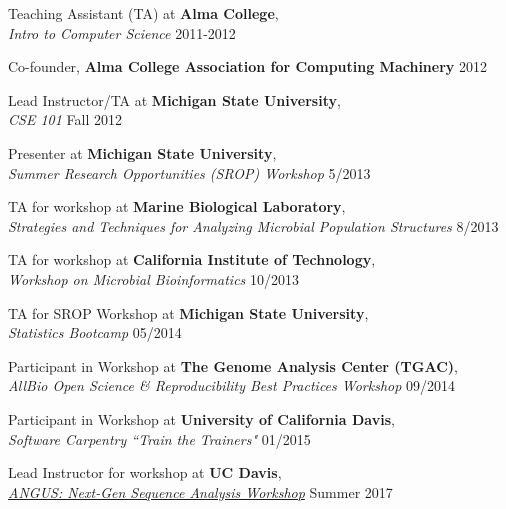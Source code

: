 \documentclass[margin,12pt]{camille_resume}
\begin{document}
\begin{resume}
\begin{list1}
\item[] Teaching Assistant (TA) at {\bf Alma College},\\
{\em Intro to Computer Science} \hfill 2011-2012\\

\item[] Co-founder, {\bf Alma College Association for Computing Machinery} \hfill 2012\\

\item[] Lead Instructor/TA at {\bf Michigan State University},\\
{\em CSE 101} \hfill Fall 2012\\

\item[] Presenter at {\bf Michigan State University},\\
{\em Summer Research Opportunities (SROP) Workshop} \hfill 5/2013\\

\item[] TA for workshop at {\bf Marine Biological Laboratory}, \\
{\em Strategies and Techniques for Analyzing Microbial Population Structures} \hfill 8/2013\\

\item[] TA for workshop at {\bf California Institute of Technology}, \\
{\em Workshop on Microbial Bioinformatics}  \hfill 10/2013\\

\item[] TA for SROP Workshop at {\bf Michigan State University}, \\
{\em Statistics Bootcamp} \hfill 05/2014\\

\item[] Participant in Workshop at {\bf The Genome Analysis Center (TGAC)},\\
{\em AllBio Open Science \& Reproducibility Best Practices Workshop} \hfill 09/2014\\

\item[] Participant in Workshop at {\bf University of California Davis},\\
{\em Software Carpentry ``Train the Trainers" } \hfill 01/2015\\

\item[] Lead Instructor for workshop at {\bf UC Davis},\\
{\em \href{https://angus.readthedocs.io/en/2017/}{ANGUS: Next-Gen Sequence Analysis Workshop}} \hfill Summer 2017\\


\end{list1}
\end{resume}
\end{document}
